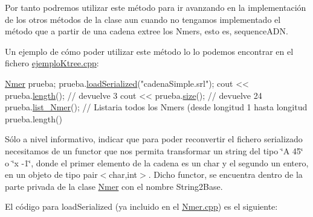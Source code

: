 Por tanto podremos utilizar este método para ir avanzando en la implementación de los otros métodos de la clase aun cuando no tengamos implementado el método que a partir de una cadena extree los Nmers, esto es, sequence\+A\+DN.

Un ejemplo de cómo poder utilizar este método lo lo podemos encontrar en el fichero \hyperlink{ejemploKtree_8cpp}{ejemplo\+Ktree.\+cpp}\+:


\begin{DoxyCode}
\hyperlink{classNmer}{Nmer} prueba;
prueba.\hyperlink{classNmer_a418c016bb6e04d2f699ddb694ee0221f}{loadSerialized}(\textcolor{stringliteral}{"cadenaSimple.srl"});
cout << prueba.\hyperlink{classNmer_a60e2335600c01ee39e865790015818f0}{length}(); \textcolor{comment}{// devuelve 3}
cout << prueba.\hyperlink{classNmer_accdea65838fcd53c48a2d05f6809643f}{size}(); \textcolor{comment}{// devuelve 24}
prueba.\hyperlink{classNmer_a1ce1c0cb174d94685c7234f58f9dc119}{list\_Nmer}();  \textcolor{comment}{// Listaria todos los Nmers (desde longitud 1 hasta longitud prueba.length()}
\end{DoxyCode}


Sólo a nivel informativo, indicar que para poder reconvertir el fichero serializado necesitamos de un functor que nos permita transformar un string del tipo \char`\"{}\+A 45\char`\"{} o \char`\"{}x -\/1\char`\"{}, donde el primer elemento de la cadena es un char y el segundo un entero, en un objeto de tipo pair$<$char,int$>$. Dicho functor, se encuentra dentro de la parte privada de la clase \hyperlink{classNmer}{Nmer} con el nombre String2\+Base.

El código para load\+Serialized (ya incluido en el {\ttfamily \hyperlink{Nmer_8cpp}{Nmer.\+cpp}}) es el siguiente\+:


